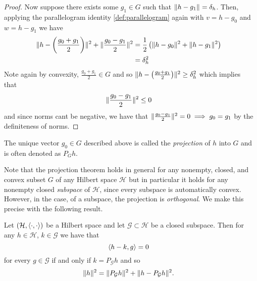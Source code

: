\begin{proof}
Now suppose there exists some $g_{1}\in G$ such that $\lVert h-g_{1}\rVert_{}=\delta_{h}$.
Then, applying the parallelogram identity \ref{def:parallelogram}
again with $v=h-g_{0}$ and $w=h-g_{1}$ we have
\begin{align*}
\lVert h-\left(\frac{g_{0}+g_{1}}{2}\right)\rVert_{}^{2}+\lVert\frac{g_{0}-g_{1}}{2}\rVert_{}^{2} & =\frac{1}{2}\left(\lVert h-g_{0}\rVert_{}^{2}+\lVert h-g_{1}\rVert_{}^{2}\right)\\
 & =\delta_{h}^{2}
\end{align*}
Note again by convexity, $\frac{g_{0}+g_{1}}{2}\in G$ and so $\lVert h-\left(\frac{g_{0}+g_{1}}{2}\right)\rVert_{}^{2}\geq\delta_{h}^{2}$
which implies that
\[
\lVert\frac{g_{0}-g_{1}}{2}\rVert_{}^{2}\leq0
\]
and since norms cant be negative, we have that $\lVert\frac{g_{0}-g_{1}}{2}\rVert_{}^{2}=0\implies g_{0}=g_{1}$
by the definiteness of norms.
\end{proof}
\begin{rem*}
The unique vector $g_{0}\in G$ described above is called the \emph{projection
}of $h$ into $G$ and is often denoted as $P_{G}h.$
\end{rem*}
Note that the projection theorem holds in general for any nonempty,
closed, and convex subset $G$ of any Hilbert space $\mathcal{H}$
but in particular it holds for any nonempty closed \emph{subspace
}of $\mathcal{H}$, since every subspace is automatically convex.
However, in the case, of a subspace, the projection is \emph{orthogonal}.
We make this precise with the following result.
\begin{cor}
\label{cor:orthProjection}Let $\left(\mathcal{H},\langle\cdot,\cdot\rangle\right)$
be a Hilbert space and let $\mathcal{G\subset\mathcal{H}}$ be a closed
subspace. Then for any $h\in\mathcal{H}$, $k\in\mathcal{G}$ we have
that
\[
\langle h-k,g\rangle=0
\]
for every $g\in\mathcal{G}$ if and only if $k=P_{\mathcal{G}}h$
and so
\[
\lVert h\rVert_{}^{2}=\lVert P_{\mathcal{G}}h\rVert_{}^{2}+\lVert h-P_{\mathcal{G}}h\rVert_{}^{2}.
\]
\end{cor}

